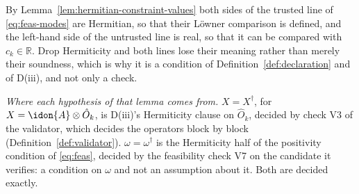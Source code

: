 
\begin{remark}
\label{rem:wellposed}
By Lemma~\ref{lem:hermitian-constraint-values} both sides of the trusted line
of \eqref{eq:feas-modes} are Hermitian, so that their L\"owner comparison is
defined, and the left-hand side of the untrusted line is real, so that it can
be compared with $c_k\in\mathbb{R}$. Drop Hermiticity and both lines lose
their meaning rather than merely their soundness, which is why it is a
condition of Definition~\ref{def:declaration} and of D(iii), and not only a
check.

\emph{Where each hypothesis of that lemma comes from.} $X=X^{\dagger}$, for
$X=\idon{A}\otimes\hat O_k$, is D(iii)'s Hermiticity clause on $\hat O_k$,
decided by check V3 of the validator, which decides the operators block by
block (Definition~\ref{def:validator}). $\omega=\omega^{\dagger}$ is the
Hermiticity half of the positivity condition of \eqref{eq:feas}, decided by
the feasibility check V7 on the candidate it verifies: a condition on
$\omega$ and not an assumption about it. Both are decided exactly.
\end{remark}
